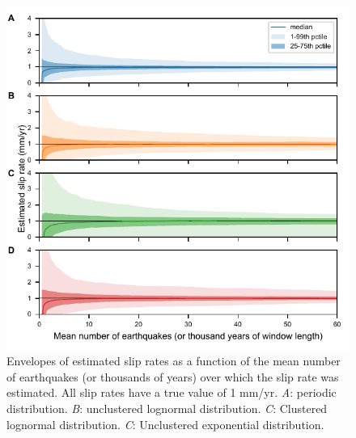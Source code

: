 \documentclass[se, manuscript]{copernicus}
\begin{document}
\begin{figure}[t]
  \includegraphics[width=12cm]{./figures/slip_rate_envelopes.pdf}
  \caption{Envelopes of estimated slip rates as a function of the mean number 
  of earthquakes (or thousands of years) over which the slip rate was 
  estimated. All slip rates have a true value of 1 mm/yr. \emph{A}: periodic 
  distribution. \emph{B}: unclustered lognormal distribution. \emph{C}: 
  Clustered lognormal distribution. \emph{C}: Unclustered exponential 
  distribution. \label{slip_rate_envelopes}}
\end{figure}

\clearpage
\end{document}
